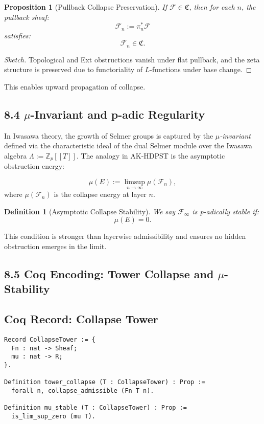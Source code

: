 \documentclass[11pt]{article}
\newtheorem{definition}[theorem]{Definition}
\newtheorem{proposition}[theorem]{Proposition}
\begin{document}
\begin{proposition}[Pullback Collapse Preservation]
\label{prop:pullback-collapse}
If \( \mathcal{F} \in \mathfrak{C} \), then for each \( n \), the pullback sheaf:
\[
\mathcal{F}_n := \pi_n^* \mathcal{F}
\]
satisfies:
\[
\mathcal{F}_n \in \mathfrak{C}.
\]
\end{proposition}

\begin{proof}[Sketch]
Topological and Ext obstructions vanish under flat pullback, and the zeta structure is preserved due to functoriality of \( L \)-functions under base change.
\end{proof}

This enables upward propagation of collapse.

\subsection*{8.4 \(\mu\)-Invariant and p-adic Regularity}

In Iwasawa theory, the growth of Selmer groups is captured by the \emph{\( \mu \)-invariant} defined via the characteristic ideal of the dual Selmer module over the Iwasawa algebra \( \Lambda := \mathbb{Z}_p[[T]] \). The analogy in AK-HDPST is the asymptotic obstruction energy:

\[
\mu(E) := \limsup_{n \to \infty} \mu(\mathcal{F}_n),
\]
where \( \mu(\mathcal{F}_n) \) is the collapse energy at layer \( n \).

\begin{definition}[Asymptotic Collapse Stability]
We say \( \mathcal{F}_\infty \) is \emph{p-adically stable} if:
\[
\mu(E) = 0.
\]
\end{definition}

This condition is stronger than layerwise admissibility and ensures no hidden obstruction emerges in the limit.

\subsection*{8.5 Coq Encoding: Tower Collapse and \(\mu\)-Stability}

\subsection*{Coq Record: Collapse Tower}
\begin{lstlisting}[language=Coq]
Record CollapseTower := {
  Fn : nat -> Sheaf;
  mu : nat -> R;
}.

Definition tower_collapse (T : CollapseTower) : Prop :=
  forall n, collapse_admissible (Fn T n).

Definition mu_stable (T : CollapseTower) : Prop :=
  is_lim_sup_zero (mu T).
\end{lstlisting}
\end{document}
